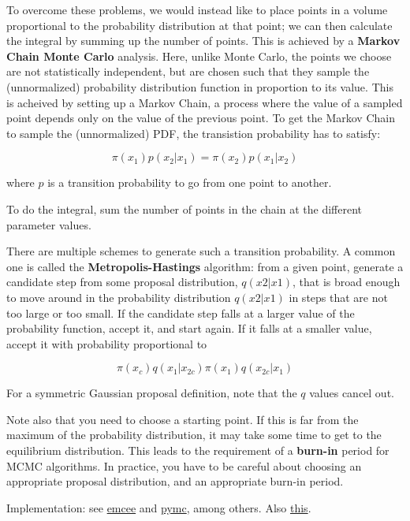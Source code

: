 \documentclass{article}
\begin{document}
To overcome these problems, we would instead like to place points in a volume
proportional to the probability distribution at that point; we can then
calculate the integral by summing up the number of points. This is achieved by
a \textbf{Markov Chain Monte Carlo} analysis. Here, unlike Monte Carlo, the
points we choose are not statistically independent, but are chosen such that
they sample the (unnormalized) probability distribution function in proportion
to its value. This is acheived by setting up a Markov Chain, a process where
the value of a sampled point depends only on the value of the previous point.
To get the Markov Chain to sample the (unnormalized) PDF, the transistion
probability has to satisfy:

$${ \pi(x_{1})p(x_{2}|x_{1}) = \pi(x_{2})p(x_{1}|x_{2})  }$$

where $p$ is a transition probability to go from one point to another.

To do the integral, sum the number of points in the chain at the different
parameter values.

There are multiple schemes to generate such a transition probability.  A common
one is called the \textbf{Metropolis-Hastings} algorithm: from a given point,
generate a candidate step from some proposal distribution, $q(x2|x1)$, that is
broad enough to move around in the probability distribution $q(x2|x1)$ in steps
that are not too large or too small. If the candidate step falls at a larger
value of the probability function, accept it, and start again. If it falls at a
smaller value, accept it with probability proportional to

$${ \pi(x_c)q(x_1|x_{2c}) \pi(x_1)q(x_{2c}|x_1)  }$$

For a symmetric Gaussian proposal definition, note that the $q$ values
cancel out.

Note also that you need to choose a starting point. If this is far from the
maximum of the probability distribution, it may take some time to get to the
equilibrium distribution. This leads to the requirement of a \textbf{burn-in}
period for MCMC algorithms.  In practice, you have to be careful about choosing
an appropriate proposal distribution, and an appropriate burn-in period.

Implementation: see \href{http://dan.iel.fm/emcee/current/}
{emcee} and \href{https://pymc-devs.github.io/pymc/}
{pymc}, among others. Also
\href{http://jakevdp.github.io/blog/2014/06/14/frequentism-and-bayesianism-4-bayesian-in-python/}
{this}.
\end{document}
